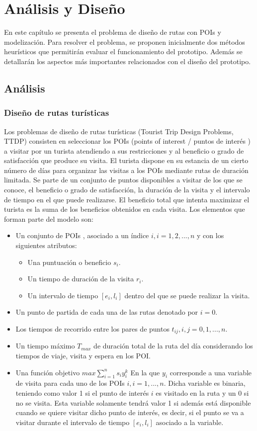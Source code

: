 \chapter{Análisis y Diseño}
En este capítulo se presenta el problema de diseño de rutas con POIs y modelización. Para resolver el problema, se proponen inicialmente dos métodos heurísticos que permitirán evaluar el funcionamiento del prototipo. Además se detallarán los aspectos más importantes relacionados con el diseño del prototipo.
\section[Análisis]{Análisis}
\subsection[Diseño de rutas turísticas]{Diseño de rutas turísticas}
Los problemas de diseño de rutas turísticas (Tourist Trip Design Problems, TTDP) consisten en seleccionar los POIs (points of interest / puntos de interés ) a visitar por un turista atendiendo a sus restricciones y al beneficio o grado de satisfacción que produce su visita. El turista dispone en su estancia de un cierto número de días para organizar las visitas a los POIs mediante rutas de duración limitada. Se parte de un conjunto de puntos disponibles a visitar de los que se conoce, el beneficio o grado de satisfacción, la duración de la visita y el intervalo de tiempo en el que puede realizarse. El beneficio total que intenta maximizar el turista es la suma de los beneficios obtenidos en cada visita.\newline
Los elementos que forman parte del modelo son:
\begin{itemize}
	\item Un conjunto de POIs , asociado a un índice $i, i=1,2,...,n$ y con los siguientes atributos:
	\begin{itemize}
		\item Una puntuación o beneficio $s_i$.
		\item Un tiempo de duración de la visita $r_i$.
		\item Un intervalo de tiempo $[e_i,l_i]$ dentro del que se puede realizar la visita.
	\end{itemize}
	\item Un punto de partida de cada una de las rutas denotado por $i=0$.
	\item Los tiempos de recorrido entre los pares de puntos $t_{ij}, i,j=0,1,...,n$.
	\item Un tiempo máximo $T_{max}$ de duración total de la ruta del día considerando los tiempos de viaje, visita y espera en los POI.
	\item Una función objetivo $max \sum_{i=1}^{n}s_iy_i^k$ \newline
	En la que $y_i$ corresponde a una variable de visita para cada uno de los POIs $i, i=1,...,n$. Dicha variable es binaria, teniendo como valor 1 si el punto de interés $i$ es visitado en la ruta y un 0 si no se visita. Esta variable solamente tendrá valor 1 si además está disponible cuando se quiere visitar dicho punto de interés, es decir, si el punto se va a visitar durante el intervalo de tiempo $[e_i,l_i]$ asociado a la variable.
\end{itemize}
